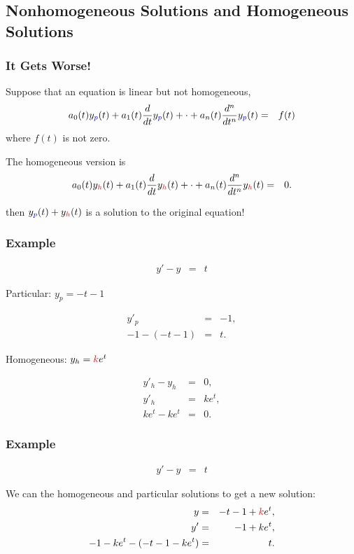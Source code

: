 \subsection{Nonhomogeneous Solutions and Homogeneous Solutions}


\begin{frame}
  \frametitle{It Gets Worse!}

  Suppose that an equation is linear but not homogeneous,
  \begin{eqnarray*}
    a_0(t) y_{{\color{blue}p}}(t) + a_1(t) \frac{d}{dt} y_{{\color{blue}p}}(t) + \cdot + a_n(t) \frac{d^n}{dt^n} y_{{\color{blue}p}}(t) & = & f(t)
  \end{eqnarray*}
  where $f(t)$ is not zero.

  The homogeneous version is
  \begin{eqnarray*}
    a_0(t) y_{{\color{red}h}}(t) + a_1(t) \frac{d}{dt} y_{{\color{red}h}}(t) + \cdot + a_n(t) \frac{d^n}{dt^n} y_{{\color{red}h}}(t) & = & 0.
  \end{eqnarray*}

  then $y_{{\color{blue}p}}(t)+y_{{\color{red}h}}(t)$ is a solution to the original equation!


\end{frame}


\begin{frame}
  \frametitle{Example}

  \begin{eqnarray*}
    y' - y & = & t
  \end{eqnarray*}

  Particular: $y_p = -t-1$

  \begin{eqnarray*}
    y'_p & = & -1, \\
    -1 - (-t -1) & = & t.
  \end{eqnarray*}

  Homogeneous: $y_h = {\color{red}k} e^t$

  \begin{eqnarray*}
    y'_h - y_h & = & 0, \\
    y'_h & = & k e^t, \\
    k e^t - k e^t & = & 0.
  \end{eqnarray*}

\end{frame}

\begin{frame}
  \frametitle{Example}

  \begin{eqnarray*}
    y' - y & = & t
  \end{eqnarray*}

  We can the homogeneous and particular solutions to get a new solution:
  \begin{eqnarray*}
    y & = & -t - 1 + {\color{red}k}e^t, \\
    y' & = & -1 + ke^t, \\
    -1-ke^t - (-t-1-ke^t) & = & t.
  \end{eqnarray*}

\end{frame}


